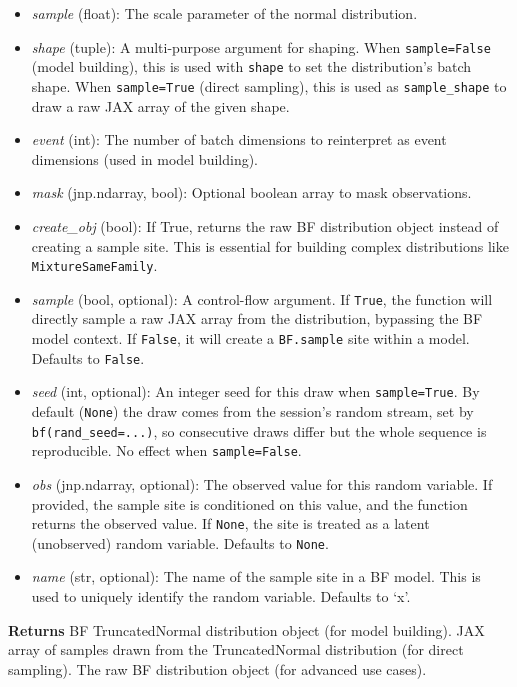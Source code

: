 \documentclass[
  letterpaper,
  DIV=11,
  numbers=noendperiod]{scrartcl}
\begin{document}
\begin{itemize}
\item
  \emph{sample} (float): The scale parameter of the normal distribution.
\item
  \emph{shape} (tuple): A multi-purpose argument for shaping. When
  \texttt{sample=False} (model building), this is used with
  \texttt{shape} to set the distribution's batch shape. When
  \texttt{sample=True} (direct sampling), this is used as
  \texttt{sample\_shape} to draw a raw JAX array of the given shape.
\item
  \emph{event} (int): The number of batch dimensions to reinterpret as
  event dimensions (used in model building).
\item
  \emph{mask} (jnp.ndarray, bool): Optional boolean array to mask
  observations.
\item
  \emph{create\_obj} (bool): If True, returns the raw BF distribution
  object instead of creating a sample site. This is essential for
  building complex distributions like \texttt{MixtureSameFamily}.
\item
  \emph{sample} (bool, optional): A control-flow argument. If
  \texttt{True}, the function will directly sample a raw JAX array from
  the distribution, bypassing the BF model context. If \texttt{False},
  it will create a \texttt{BF.sample} site within a model. Defaults to
  \texttt{False}.
\item
  \emph{seed} (int, optional): An integer seed for this draw when
  \texttt{sample=True}. By default (\texttt{None}) the draw comes from
  the session's random stream, set by \texttt{bf(rand\_seed=...)}, so
  consecutive draws differ but the whole sequence is reproducible. No
  effect when \texttt{sample=False}.
\item
  \emph{obs} (jnp.ndarray, optional): The observed value for this random
  variable. If provided, the sample site is conditioned on this value,
  and the function returns the observed value. If \texttt{None}, the
  site is treated as a latent (unobserved) random variable. Defaults to
  \texttt{None}.
\item
  \emph{name} (str, optional): The name of the sample site in a BF
  model. This is used to uniquely identify the random variable. Defaults
  to `x'.
\end{itemize}

\textbf{Returns} BF TruncatedNormal distribution object (for model
building). JAX array of samples drawn from the TruncatedNormal
distribution (for direct sampling). The raw BF distribution object (for
advanced use cases).
\end{document}
